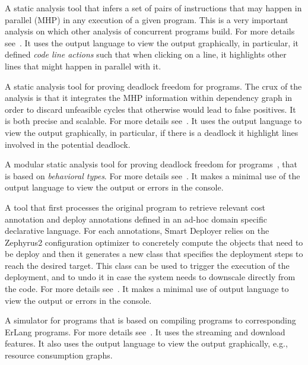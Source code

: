{%
%
A static analysis tool that infers a set of pairs of instructions that
may happen in parallel (MHP) in any execution of a given \abs
program. This is a very important analysis on which other analysis of
concurrent programs build.
%
}
{%
%
For more details see~\cite{mhpsaco1,mhpsaco2,mhpsaco3,mhpsaco4}.
%
}
{%
%
  It uses the \ei output language to view the output graphically, in
  particular, it defined \emph{code line actions} such that when
  clicking on a line, it highlights other lines that might happen in
  parallel with it.
%
}

{%
%
  A static analysis tool for proving deadlock freedom for \abs
  programs. The crux of the analysis is that it integrates the MHP
  information within dependency graph in order to discard unfeasible
  cycles that otherwise would lead to false positives. It is both
  precise and scalable.
%
}
{%
%
For more details see~\cite{dasaco}.
%
}
{%
%
  It uses the \ei output language to view the output graphically, in
  particular, if there is a deadlock it highlight lines involved in
  the potential deadlock.
%
}

{%
%
  A modular static analysis tool for proving deadlock freedom for \abs
  programs~\cite{johnsen10fmco}, that is based on \emph{behavioral types}.
%
}
{%
%
For more details see~\cite{dadsa,Giachino2015}.
%
}
{%
%
  It makes a minimal use of the \ei output language to view the output
  or errors in the console.
%
}


{%
%
  A tool that first processes the original \abs program to retrieve
  relevant cost annotation and deploy annotations defined in an ad-hoc
  domain specific declarative language. For each annotations, Smart
  Deployer relies on the Zephyrus2 configuration optimizer to
  concretely compute the objects that need to be deploy and then it
  generates a new \abs class that specifies the deployment steps to
  reach the desired target. This class can be used to trigger the
  execution of the deployment, and to undo it in case the system needs
  to downscale directly from the \abs code.
%
}
{%
%
For more details see~\cite{abssd}.
%
}
{%
%
  It makes a minimal use of \ei output language to view the output or
  errors in the console.
%
}


{%
%
A simulator for \abs programs that is based on compiling \abs programs
to corresponding ErLang programs.
%
}
{%
%
For more details see~\cite{abses}.
%
}
{%
%
  It uses the streaming and download features.  It also uses the \ei
  output language to view the output graphically, e.g., resource
  consumption graphs.
%
}

